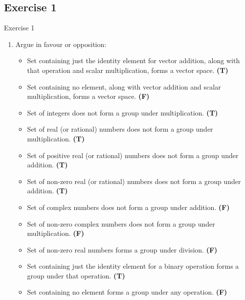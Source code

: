 \documentclass{beamer}
\newcounter{savedenum}
\newcommand*{\saveenum}{\setcounter{savedenum}{\theenumi}}
\begin{document}
\subsection{Exercise 1}

\begin{frame}{Exercise 1}
    \begin{enumerate}
        \item Argue in favour or opposition:
        \begin{itemize}
            \item Set containing just the identity element for vector addition, along with that operation and scalar multiplication, forms a vector space. \textbf{(T)}
            \item Set containing no element, along with vector addition and scalar multiplication, forms a vector space. \textbf{(F)}
            \item Set of integers does not form a group under multiplication. \textbf{(T)}
            \item Set of real (or rational) numbers does not form a group under multiplication. \textbf{(T)}
            \item Set of positive real (or rational) numbers does not form a group under addition. \textbf{(T)}
            \item Set of non-zero real (or rational) numbers does not form a group under addition. \textbf{(T)}
            \item Set of complex numbers does not form a group under addition. \textbf{(F)} 
            \item Set of non-zero complex numbers does not form a group under multiplication. \textbf{(F)}
            \item Set of non-zero real numbers forms a group under division. \textbf{(F)}
            \item Set containing just the identity element for a binary operation forms a group under that operation. \textbf{(T)}
            \item Set containing no element forms a group under any operation. \textbf{(F)}
        \end{itemize}
        \saveenum
    \end{enumerate}
\end{frame}
\end{document}
